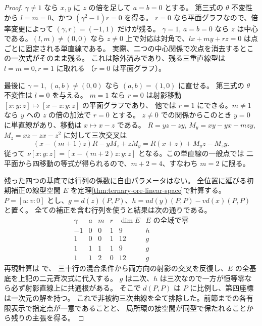 \begin{proof}
$\gamma\ne1$ なら $x,y$ に $z$ の倍を足して $a=b=0$ とする。
第三式の $\theta$ 不変性から $l=m=0$、かつ $(\gamma^2-1)r=0$ を得る。
$r=0$ なら平面グラフなので、倍率変更によって $(\gamma,r)=(-1,1)$ だけが残る。
$\gamma=1$, $a=b=0$ なら $z$ は中心である。$(l,m)\ne(0,0)$ なら
$z\ne0$ 上で対応は対角で、$lx+my+rz=0$ は点ごとに固定される単直線である。
実際、二つの中心関係で次点を消去するとこの一次式がそのまま残る。
これは除外済みであり、残る三重直線型は $l=m=0,r=1$ に取れる
（$r=0$ は平面グラフ）。

最後に $\gamma=1$, $(a,b)\ne(0,0)$ なら $(a,b)=(1,0)$ に直せる。
第三式の $\theta$ 不変性は $l=0$ を与える。
$m=1$ なら $r=0$ は射影移動 $[x:y:z]\mapsto[x-z:y:z]$ の平面グラフであり、
他では $r=1$ にできる。$m\ne1$ なら $y$ への $z$ の倍の加法で $r=0$ とする。
$z\ne0$ での関係からこのとき $y=0$ に単直線があり、移動は $x\mapsto x-z$ である。
$R=yz-zy$, $M_y=xy-yx-mzy$, $M_z=xz-zx-z^2$ に対して三次交叉は
\[
 (x-(m+1)z)R-yM_z+zM_y=R(x+z)+M_yz-M_zy .
\]
従って $\nu[x:y:z]=[x-(m+2)z:y:z]$ となる。この単直線の一般点では
二平面から四移動の等式が得られるので、$m+2=4$、すなわち $m=2$ に限る。

残った四つの基底では行列の係数に自由パラメータはない。
全位置に延びる初期補正の線型空間 $E$ を定理\ref{thm:ternary-ore-linear-space}で計算する。
$P=[u:v:0]$ とし、$g=d(z)(P,P)$、$h=u d(y)(P,P)-v d(x)(P,P)$ と置く。
全ての補正を含む行列を使うと結果は次の通りである。
\[
\begin{array}{c|c|c|c|c|c}
\gamma&a&m&r&\dim E&E\text{ の全域で零}\\ \hline
-1&0&0&1&9&h\\
1&0&0&1&12&g\\
1&1&1&1&9&g\\
1&1&2&0&12&g
\end{array}
\]
再現計算は  で、
三十行の混合条件から両方向の射影の交叉を反復し、$E$ の全基底を上記の二元斉次式に代入する。
$g$ は二次、$h$ は三次なので一方が恒等零なら必ず射影直線上に共通根がある。
そこで $d(P,P)$ は $P$ に比例し、第四座標は一次元の解を持つ。
これで非被約三次曲線を全て排除した。前節までの各有限表示で指定点が一意であることと、
局所環の接空間が同型で保たれることから残りの主張を得る。
\end{proof}
